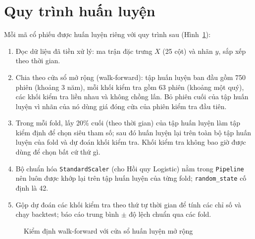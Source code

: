 \documentclass[12pt,a4paper,oneside]{report}
\begin{document}
\section{Quy trình huấn luyện}
\label{sec:quytrinh}
Mỗi mã cổ phiếu được huấn luyện riêng với quy trình sau (Hình~\ref{fig:quytrinhhuanluyen}):
\begin{enumerate}[label=(\arabic*)]
  \item Đọc dữ liệu đã tiền xử lý: ma trận đặc trưng $X$ (25 cột) và nhãn $y$,
        sắp xếp theo thời gian.
  \item Chia theo cửa sổ mở rộng (walk-forward): tập huấn luyện ban đầu gồm 750
        phiên (khoảng 3 năm), mỗi khối kiểm tra gồm 63 phiên (khoảng một quý), các
        khối kiểm tra liền nhau và không chồng lấn. Bỏ phiên cuối của tập huấn
        luyện vì nhãn của nó dùng giá đóng cửa của phiên kiểm tra đầu tiên.
  \item Trong mỗi fold, lấy 20\% cuối (theo thời gian) của tập huấn luyện làm tập
        kiểm định để chọn siêu tham số; sau đó huấn luyện lại trên toàn bộ tập huấn
        luyện của fold và dự đoán khối kiểm tra. Khối kiểm tra không bao giờ được
        dùng để chọn bất cứ thứ gì.
  \item Bộ chuẩn hóa \texttt{StandardScaler} (cho Hồi quy Logistic) nằm trong
        \texttt{Pipeline} \cite{pedregosa2011} nên luôn được khớp lại trên tập huấn
        luyện của từng fold; \texttt{random\_state} cố định là 42.
  \item Gộp dự đoán các khối kiểm tra theo thứ tự thời gian để tính các chỉ số và
        chạy backtest; báo cáo trung bình $\pm$ độ lệch chuẩn qua các fold.
\end{enumerate}

\begin{figure}[H]
  \centering
  \caption{Kiểm định walk-forward với cửa sổ huấn luyện mở rộng}
  \label{fig:quytrinhhuanluyen}
\end{figure}
\end{document}
